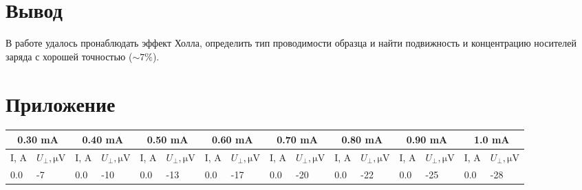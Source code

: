 \documentclass[12pt, a4paper]{article}
\begin{document}
\section{Вывод}
В работе удалось пронаблюдать эффект Холла, определить тип проводимости образца и найти подвижность и концентрацию носителей заряда с хорошей точностью ($\sim 7\%$).
\section{Приложение}


\begin{table}[H]
  \hspace{-4mm}
  \footnotesize
  \begin{tabular}{|ll|ll|ll|ll|ll|ll|ll|ll|}
    \hline
    \multicolumn{2}{|c|}{0.30 mA}                           & \multicolumn{2}{c|}{0.40 mA}                           & \multicolumn{2}{c|}{0.50 mA}                           & \multicolumn{2}{c|}{0.60 mA}                           & \multicolumn{2}{c|}{0.70 mA}                           & \multicolumn{2}{c|}{0.80 mA}                           & \multicolumn{2}{c|}{0.90 mA}                           & \multicolumn{2}{c|}{1.0 mA}                            \\ \hline
    \multicolumn{1}{|r|}{I, A} & \multicolumn{1}{r|}{\parbox{6mm}{\!\!\tiny$U_\perp, \mathrm{\mu V}$}} & \multicolumn{1}{r|}{I, A} & \multicolumn{1}{r|}{\parbox{6mm}{\!\!\tiny$U_\perp, \mathrm{\mu V}$}} & \multicolumn{1}{r|}{I, A} & \multicolumn{1}{r|}{\parbox{6mm}{\!\!\tiny$U_\perp, \mathrm{\mu V}$}} & \multicolumn{1}{r|}{I, A} & \multicolumn{1}{r|}{\parbox{6mm}{\!\!\tiny$U_\perp, \mathrm{\mu V}$}} & \multicolumn{1}{r|}{I, A} & \multicolumn{1}{r|}{\parbox{6mm}{\!\!\tiny$U_\perp, \mathrm{\mu V}$}} & \multicolumn{1}{r|}{I, A} & \multicolumn{1}{r|}{\parbox{6mm}{\!\!\tiny$U_\perp, \mathrm{\mu V}$}} & \multicolumn{1}{r|}{I, A} & \multicolumn{1}{r|}{\parbox{6mm}{\!\!\tiny$U_\perp, \mathrm{\mu V}$}} & \multicolumn{1}{r|}{I, A} & \multicolumn{1}{r|}{\parbox{6mm}{\!\!\tiny$U_\perp, \mathrm{\mu V}$}} \\ \hline
    \multicolumn{1}{|l|}{0.0}  & -7                         & \multicolumn{1}{l|}{0.0}  & -10                        & \multicolumn{1}{l|}{0.0}  & -13                        & \multicolumn{1}{l|}{0.0}  & -17                        & \multicolumn{1}{l|}{0.0}  & -20                        & \multicolumn{1}{l|}{0.0}  & -22                        & \multicolumn{1}{l|}{0.0}  & -25                        & \multicolumn{1}{l|}{0.0}  & -28                        \\ \hline

\end{tabular}
\end{table}
\end{document}
